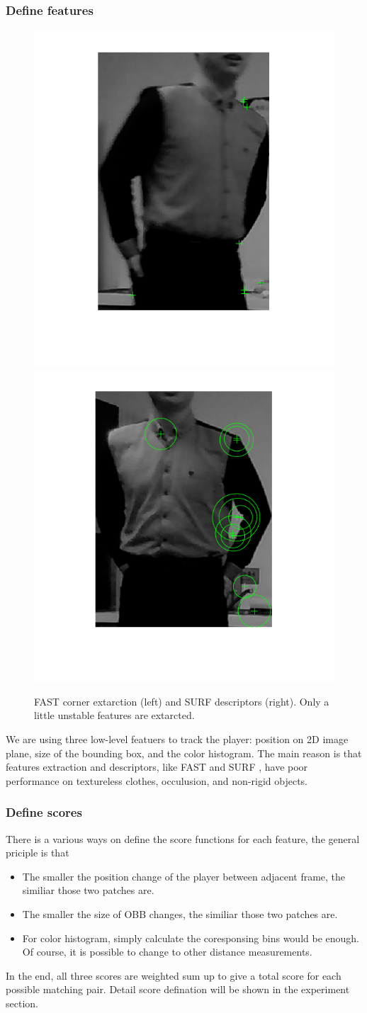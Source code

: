 \documentclass[11pt,twocolumn,letterpaper]{article}
\begin{document}
\subsubsection*{Define features}
      \begin{figure}[h]
      \centering
      \includegraphics[width=0.45\linewidth]{./Pic/FAST.png}
	\includegraphics[width=0.45\linewidth]{./Pic/SURF.png}
      \caption{FAST corner extarction (left) and SURF descriptors (right). Only a little unstable features are extarcted.}
      \end{figure}
We are using three low-level featuers to track the player: position on 2D image plane, size of the bounding box, and the color histogram. The main reason is that features extraction and descriptors, like FAST \cite{1544896} and SURF \cite{Bay2006}, have poor performance on textureless clothes, occulusion, and non-rigid objects.
\subsubsection*{Define scores}
There is a various ways on define the score functions for each feature, the general priciple is that 
\begin{itemize}
\item The smaller the position change of the player between adjacent frame, the similiar those two patches are.
\item The smaller the size of OBB changes, the similiar those two patches are.
\item For color histogram, simply calculate the coresponsing bins would be enough. Of course, it is possible to change to other distance measurements.
\end{itemize}
\par
In the end, all three scores are weighted sum up to give a total score for each possible matching pair. Detail score defination will be shown in the experiment section.
\end{document}
